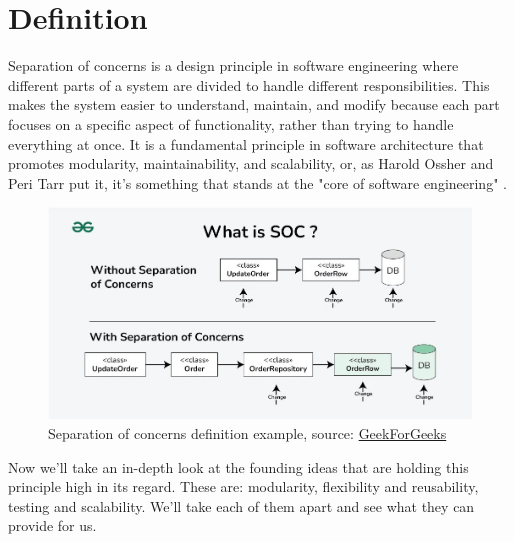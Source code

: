\section{Definition}
Separation of concerns is a design principle in software engineering where different parts of a system are divided to handle different responsibilities.
This makes the system easier to understand, maintain, and modify because each part focuses on a specific aspect of functionality, 
rather than trying to handle everything at once.
It is a fundamental principle in software architecture that promotes modularity, maintainability, and scalability, or, as Harold Ossher and Peri Tarr put it, 
it's something that stands at the "core of software engineering" \cite{definitionSOC}.
\begin{figure}[htbp]
    \centering
    \includegraphics[scale=0.4]{pictures/soc_definition_example.jpg}
    \caption{Separation of concerns definition example, source: \href{https://www.geeksforgeeks.org/separation-of-concerns-soc/}{GeekForGeeks}}
    \label{arpanetLogicaMap}
\end{figure}
\par
Now we'll take an in-depth look at the founding ideas that are holding this principle high in its regard.
These are: modularity, flexibility and reusability, testing and scalability.
We'll take each of them apart and see what they can provide for us.


